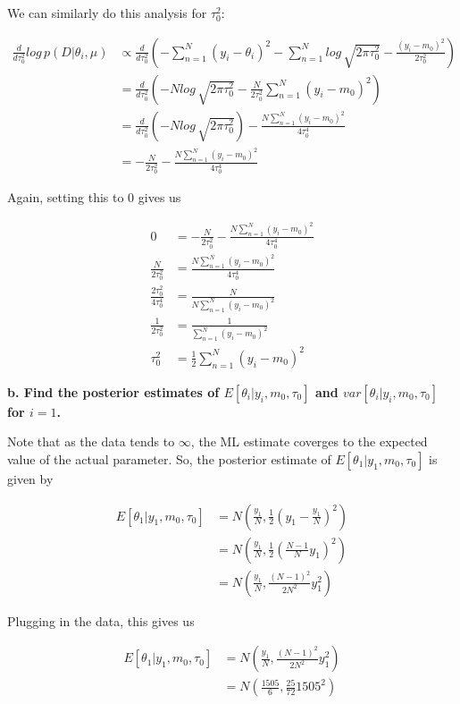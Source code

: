 {We can similarly do this analysis for $\tau_0^2$:

\begin{align}
    \frac{d}{d\tau_0^2} log\,p(D|\theta_i,\mu) & \propto
    \frac{d}{d\tau_0^2} (-\sum_{n=1}^N (y_i - \theta_i)^2 - \sum_{n=1}^N
    log\,\sqrt{2\pi\tau_0^2} - \frac{(y_i-m_0)^2}{2\tau_0^2}) \\
    & = \frac{d}{d\tau_0^2} (-Nlog\,\sqrt{2\pi\tau_0^2} - \frac{N}{2\tau_0^2}
        \sum_{n=1}^N (y_i-m_0)^2) \\
    & = \frac{d}{d\tau_0^2} (-Nlog\,\sqrt{2\pi\tau_0^2}) -
        \frac{N\sum_{n=1}^N (y_i-m_0)^2}{4\tau_0^4} \\
    & = -\frac{N}{2\tau_0^2} - \frac{N\sum_{n=1}^N (y_i-m_0)^2}{4\tau_0^4}
\end{align}

Again, setting this to $0$ gives us

\begin{align}
    0 & = -\frac{N}{2\tau_0^2} - \frac{N\sum_{n=1}^N (y_i-m_0)^2}{4\tau_0^4} \\
    \frac{N}{2\tau_0^2} & = \frac{N\sum_{n=1}^N (y_i-m_0)^2}{4\tau_0^4} \\
    \frac{2\tau_0^2}{4\tau_0^4} & = \frac{N}{N\sum_{n=1}^N (y_i-m_0)^2} \\
    \frac{1}{2\tau_0^2} & = \frac{1}{\sum_{n=1}^N (y_i-m_0)^2} \\
    \tau_0^2 & = \frac{1}{2}\sum_{n=1}^N (y_i-m_0)^2
\end{align}

\textbf{b. Find the posterior estimates of $E[\theta_i|y_i,m_0,\tau_0]$
and $var[\theta_i|y_i,m_0,\tau_0]$ for $i=1$.}

Note that as the data tends to $\infty$, the ML estimate coverges to the
expected value of the actual parameter. So, the posterior estimate of
$E[\theta_1|y_1,m_0,\tau_0]$ is given by

\begin{align}
    E[\theta_1|y_1,m_0,\tau_0] & = N(\frac{y_1}{N},\frac{1}{2}
    (y_1 - \frac{y_1}{N})^2) \\
    & = N(\frac{y_1}{N}, \frac{1}{2}(\frac{N-1}{N}y_1)^2) \\
    & = N(\frac{y_1}{N}, \frac{(N-1)^2}{2N^2}y_1^2)
\end{align}

Plugging in the data, this gives us

\begin{align}
    E[\theta_1|y_1,m_0,\tau_0] & = N(\frac{y_1}{N}, \frac{(N-1)^2}{2N^2}y_1^2) \\
    & = N(\frac{1505}{6}, \frac{25}{72}1505^2)
\end{align}

}
